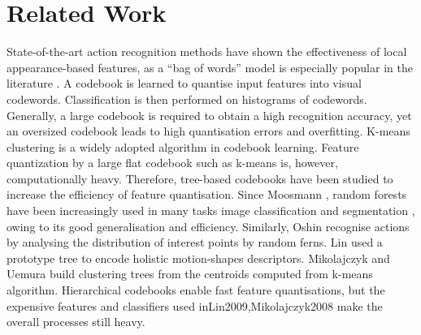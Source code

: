 \section{Related Work}
\label{sec:relatedwork}
State-of-the-art action recognition methods have shown the effectiveness of local appearance-based features, as a ``bag of words'' model is especially popular in the literature \cite{Dollar2005, Riemenschneider2009, Niebles2008, Schuldt2004, Wong2007}. A codebook is learned to quantise input features into visual codewords. Classification is then performed on histograms of codewords. Generally, a large codebook is required to obtain a high recognition accuracy, yet an oversized codebook leads to high quantisation errors and overfitting. K-means clustering is a widely adopted algorithm in codebook learning. Feature quantization by a large flat codebook such as k-means is, however, computationally heavy. Therefore, tree-based codebooks have been studied to increase the efficiency of feature quantisation. 
Since Moosmann \etal \cite{Moosmann2007}, random forests have been increasingly used in many tasks \eg image classification and segmentation \cite{Shotton2008}, owing to its good generalisation and efficiency. Similarly, Oshin \etal \cite{Oshin2009} recognise actions by analysing the distribution of interest points by random ferns. Lin \etal \cite{Lin2009} used a prototype tree to encode holistic motion-shapes descriptors. Mikolajczyk and Uemura \cite{Mikolajczyk2008} build clustering trees from the centroids computed from k-means algorithm. 
Hierarchical codebooks enable fast feature quantisations, but the expensive features and classifiers used in{Lin2009,Mikolajczyk2008} make the overall processes still heavy.

